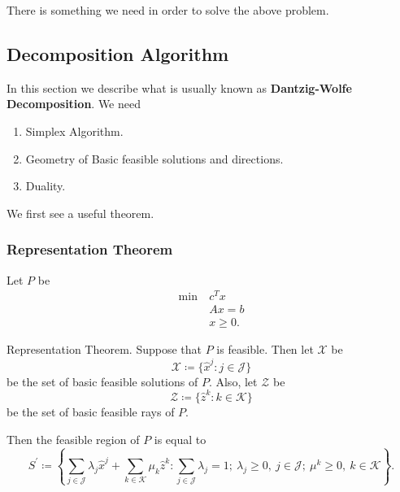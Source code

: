 There is something we need in order to solve the above problem.

\subsection{Decomposition Algorithm}
In this section we describe what is usually known as \textbf{Dantzig-Wolfe Decomposition}. We need
\begin{enumerate}
	\item Simplex Algorithm.
	\item Geometry of Basic feasible solutions and directions.
	\item Duality.
\end{enumerate}

We first see a useful theorem.
\subsubsection{Representation Theorem}
Let \(P\) be
\begin{align*}
	\min~ & c^Tx     \\
	      & Ax = b   \\
	      & x\geq 0.
\end{align*}

\begin{theorem}
	Representation Theorem. Suppose that \(P\) is feasible. Then let \(\mathcal{X}\) be
	\[
		\mathcal{X} \coloneqq \{\hat{x}^j \colon j\in \mathcal{J}\}
	\]
	be the set of basic feasible solutions of \(P\). Also, let \(\mathcal{Z}\) be
	\[
		\mathcal{Z}\coloneqq \{\hat{z}^k\colon k\in \mathcal{K}\}
	\]
	be the set of basic feasible rays of \(P\).

	Then the feasible region of \(P\) is equal to
	\[
		S^\prime\coloneqq \left\{\sum\limits_{j\in\mathcal{J}} \lambda_{j} \hat{x}^j + \sum\limits_{k\in\mathcal{K}}\mu_k \hat{z}^k\colon \sum\limits_{j\in\mathcal{J}}\lambda_{j} = 1;\ \lambda_{j}\geq 0,\ j\in \mathcal{J};\ \mu^k\geq 0,\ k\in \mathcal{K}\right\}.
	\]
\end{theorem}

